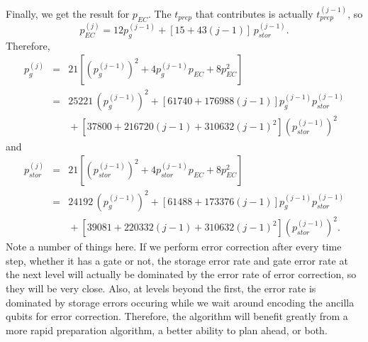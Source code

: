 \documentclass{report}
\newcommand{\pgj}[1]{p_g^{({#1})}}
\newcommand{\psj}[1]{p_{stor}^{({#1})}}
\newcommand{\tpj}[1]{t_{prep}^{({#1})}}
\begin{document}
Finally, we get the result for $p_{EC}$.  The $t_{prep}$ that contributes is 
actually $\tpj{j-1}$, so
\begin{equation}
p_{EC}^{(j)} = 12 \pgj{j-1} + [15 + 43 (j-1)]\,\psj{j-1}.
\end{equation}
Therefore,
\begin{eqnarray}
\pgj{j} & = & 21 \left[(\pgj{j-1})^2 + 4 \pgj{j-1} p_{EC} + 8 p_{EC}^2
\right] \\
& = & 25221\,(\pgj{j-1})^2 + \left[61740 + 176988 (j-1) \right] \pgj{j-1} 
\psj{j-1} \nonumber \\
& & \mbox{} + \left[37800 + 216720 (j-1) + 310632 (j-1)^2 \right] (\psj{j-1})^2
\end{eqnarray}
and
\begin{eqnarray}
\psj{j} & = & 21 \left[(\psj{j-1})^2 + 4 \psj{j-1} p_{EC} + 8 p_{EC}^2
\right] \\
& = & 24192\,(\pgj{j-1})^2 + \left[61488 + 173376 (j-1) \right] \pgj{j-1} 
\psj{j-1} \nonumber \\
& & \mbox{} + \left[39081 + 220332 (j-1) + 310632 (j-1)^2 \right] (\psj{j-1})^2.
\end{eqnarray}
Note a number of things here.  If we perform error correction after every 
time step, whether it has a gate or not, the storage error rate and gate 
error rate at the next level will actually be dominated by the error rate of 
error correction, so they will be very close.  Also, at levels beyond the 
first, the error rate is dominated by storage errors occuring while we wait 
around encoding the ancilla qubits for error correction.  Therefore, the 
algorithm will benefit greatly from a more rapid preparation algorithm, a 
better ability to plan ahead, or both.
\end{document}
